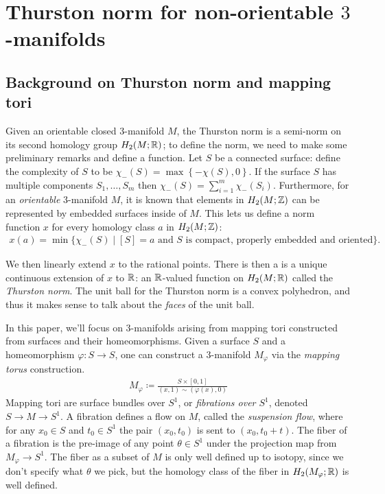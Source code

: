 \section{Thurston norm for non-orientable $3$-manifolds}
\label{sec:thur-norm-non-orientable}

\subsection{Background on Thurston norm and mapping tori}
\label{sec:backgr-thurst-norm}

Given an orientable closed $3$-manifold $M$, the Thurston norm is a semi-norm on its second homology group $H_2(M; \mathbb{R})$; to define the norm, we need to make some preliminary remarks and define a function.
Let $S$ be a connected surface: define the complexity of $S$ to be $\chi_-(S) = \max\left\{-\chi(S),0\right\}$.
If the surface $S$ has multiple components $S_1, \ldots, S_m$ then $\chi_-(S) = \displaystyle\sum_{i=1}^m\chi_-(S_i)$.
Furthermore, for an \emph{orientable} 3-manifold $M$, it is known that elements in $H_2(M ; \mathbb{Z})$ can be represented by embedded surfaces inside of $M$.
This lets us define a norm function $x$ for every homology class $a$ in $H_2(M; \mathbb{Z})$:
\begin{align*}
  x(a) = \min\{\chi_-(S) \mid [S] = a \text{ and $S$ is compact, properly embedded and oriented}\}.
\end{align*}

We then linearly extend $x$ to the rational points.
There is then a is a unique continuous extension of $x$ to $\mathbb{R}$: an $\mathbb{R}$-valued function on $H_2(M; \mathbb{R})$ called the \emph{Thurston norm}.
The unit ball for the Thurston norm is a convex polyhedron, and thus it makes
sense to talk about the \emph{faces} of the unit ball.

In this paper, we'll focus on $3$-manifolds arising from mapping tori constructed from surfaces and their homeomorphisms.
Given a surface $S$ and a homeomorphism $\varphi: S \to S$, one can construct a $3$-manifold $M_\varphi$ via the \emph{mapping torus} construction.
\begin{align*}
  M_\varphi \coloneqq \frac{S \times [0,1]}{(x,1) \sim (\varphi(x), 0)}
\end{align*}
Mapping tori are surface bundles over $S^1$, or \emph{fibrations over $S^1$}, denoted $S\rightarrow M\rightarrow S^1$.
A fibration defines a flow on $M$, called the \emph{suspension flow}, where for any $x_0\in S$ and $t_0\in S^1$ the pair $(x_0,t_0)$ is sent to $(x_0,t_0+t)$.
The fiber of a fibration is the pre-image of any point $\theta \in S^1$ under the projection map from $M_{\varphi} \to S^1$.
The fiber as a subset of $M$ is only well defined up to isotopy, since we don't specify what $\theta$ we pick, but the homology class of the fiber in $H_2(M_{\varphi}; \mathbb{R})$ is well defined.

